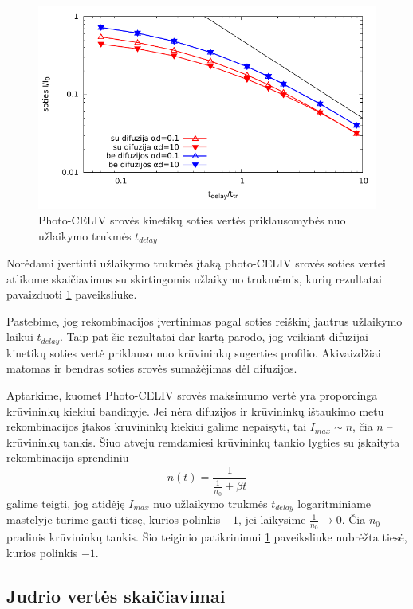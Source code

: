 \begin{figure}[htb]
  \centering
	\includegraphics{./media/pdf/delays.pdf}
  \caption{Photo-CELIV srovės kinetikų soties vertės priklausomybės nuo užlaikymo trukmės $t_{delay}$}
  \label{fig:delays}
\end{figure}

Norėdami įvertinti užlaikymo trukmės įtaką photo-CELIV srovės soties vertei atlikome skaičiavimus su skirtingomis užlaikymo trukmėmis, kurių rezultatai pavaizduoti \ref{fig:delays} paveiksliuke.

Pastebime, jog rekombinacijos įvertinimas pagal soties reiškinį jautrus užlaikymo laikui $t_{delay}$. Taip pat šie rezultatai dar kartą parodo, jog veikiant difuzijai kinetikų soties vertė priklauso nuo krūvininkų sugerties profilio. Akivaizdžiai matomas ir bendras soties srovės sumažėjimas dėl difuzijos.

Aptarkime, kuomet Photo-CELIV srovės maksimumo vertė yra proporcinga krūvininkų kiekiui bandinyje. Jei nėra difuzijos ir krūvininkų ištaukimo metu rekombinacijos įtakos krūvininkų kiekiui galime nepaisyti, tai $I_{max} \sim n$, čia $n$ -- krūvininkų tankis. Šiuo atveju remdamiesi krūvininkų tankio lygties su įskaityta rekombinacija sprendiniu $$ n(t) = \frac{1}{\frac{1}{n_0} + \beta t} $$ galime teigti, jog atidėję $I_{max}$ nuo užlaikymo trukmės $t_{delay}$ logaritminiame mastelyje turime gauti tiesę, kurios polinkis $-1$, jei laikysime $\frac{1}{n_0} \rightarrow 0$. Čia $n_0$ -- pradinis krūvininkų tankis.
Šio teiginio patikrinimui \ref{fig:delays} paveiksliuke nubrėžta tiesė, kurios polinkis $-1$.

\subsection{Judrio vertės skaičiavimai}

